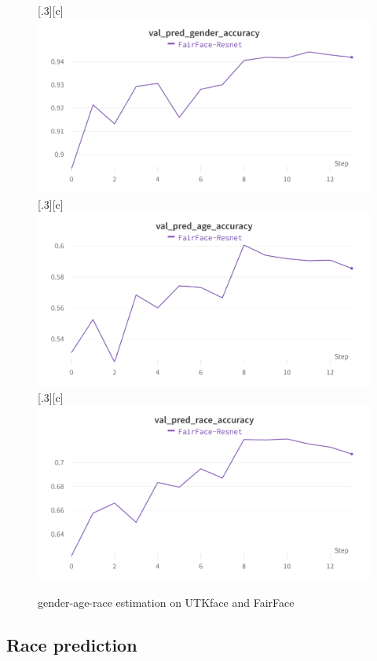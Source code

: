 \documentclass[DIV=calc, paper=a4, fontsize=10pt, twocolumn]{article}
\begin{document}
\begin{figure}[t]
		\subcaptionbox{}[.3\linewidth][c]{%
			\includegraphics[width=\linewidth]{imgs/FairFace-resnet-gender.png}}\quad
		\subcaptionbox{}[.3\linewidth][c]{%
			\includegraphics[width=\linewidth]{imgs/FairFace-resnet-age.png}}\quad
		\subcaptionbox{}[.3\linewidth][c]{%
			\includegraphics[width=\linewidth]{imgs/FairFace-resnet-race.png}}
		\caption{gender-age-race estimation on UTKface and FairFace}
		\label{gender-age-race}
	\end{figure}

	\subsection{Race prediction}
	
\end{document}
